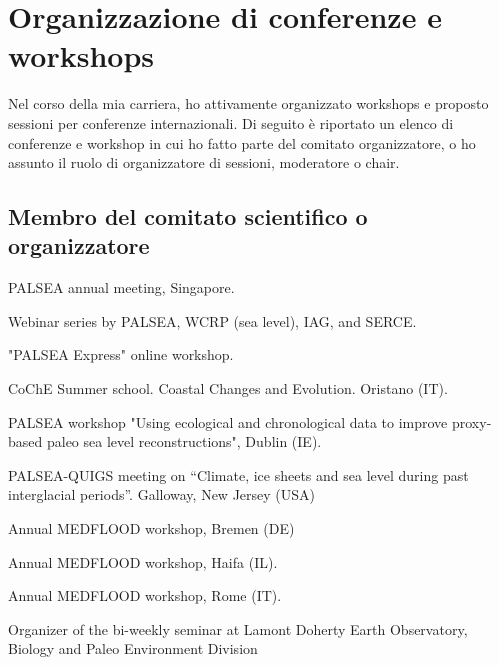 \documentclass[11pt]{article}
\begin{document}
\section{Organizzazione di conferenze e workshops}
{\normalfont Nel corso della mia carriera, ho attivamente organizzato workshops e proposto sessioni per conferenze internazionali. Di seguito è riportato un elenco di conferenze e workshop in cui ho fatto parte del comitato organizzatore, o ho assunto il ruolo di organizzatore di sessioni, moderatore o chair.}\\

{\normalfont 
\subsection{Membro del comitato scientifico o organizzatore}}
{\footnotesize
\begin{description}
  \item [2022] PALSEA annual meeting, Singapore.
  \item [2021] Webinar series by PALSEA, WCRP (sea level), IAG, and SERCE.
  \item [2020] "PALSEA Express" online workshop.
  \item [2019] CoChE Summer school. Coastal Changes and Evolution. Oristano (IT).
  \item [2019] PALSEA workshop "Using ecological and chronological data to improve proxy-based paleo sea level reconstructions", Dublin (IE).
  \item [2017] PALSEA-QUIGS meeting on “Climate, ice sheets and sea level during past interglacial periods”. Galloway, New Jersey (USA)
\item [2016] Annual MEDFLOOD workshop, Bremen (DE)
\item [2014] Annual MEDFLOOD workshop, Haifa (IL).
\item [2012] Annual MEDFLOOD workshop, Rome (IT).
\item [2013] Organizer of the bi-weekly seminar at Lamont Doherty Earth Observatory, Biology and Paleo Environment Division
  \item \end{description}}
\end{document}
